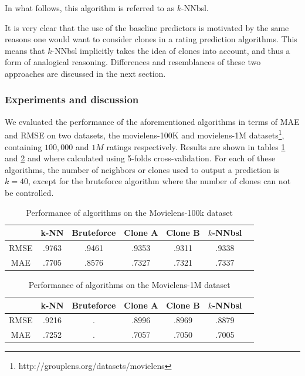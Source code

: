 In what follows, this algorithm is referred to as $k$-NNbsl.


It is very clear that the use of the baseline predictors is motivated by the
same reasons one would want to consider clones in a rating prediction
algorithms. This means that $k$-NNbsl implicitly takes the idea of clones into account, and thus a form of analogical reasoning.
Differences and resemblances of these two approaches are discussed
in the next section.

\subsubsection{Experiments and discussion}
\label{expeDiscuss}

We evaluated the performance of the aforementioned algorithms in terms of MAE
and RMSE on two datasets, the movielens-100K and movielens-1M
datasets\footnote{http://grouplens.org/datasets/movielens}, containing
$100,000$ and $1M$ ratings respectively. Results are shown in tables
\ref{table:res100k} and \ref{table:res1M} and where calculated using 5-folds
cross-validation. For each of these algorithms, the number of neighbors or
clones used to output a prediction is $k = 40$, except for the bruteforce
algorithm where the number of clones can not be controlled.
\begin{table}[!ht]
\centering
\caption{Performance of algorithms on the Movielens-100k dataset}
\label{table:res100k}
\begin{tabular}{| c || c | c | c | c | c | c |}
\toprule
     &  k-NN & Bruteforce & Clone A & Clone B & $k$-NNbsl\\
\midrule
RMSE & .9763 &   .9461    &   .9353 &  .9311  &  .9338   \\
MAE  & .7705 &   .8576    &   .7327 &  .7321  &  .7337   \\
\bottomrule
\end{tabular}
\end{table}

\begin{table}[!ht]
\centering
\caption{Performance of algorithms on the Movielens-1M dataset}
\label{table:res1M}
\begin{tabular}{| c || c | c | c | c | c | c |}
  \toprule
     &  k-NN & Bruteforce & Clone A & Clone B & $k$-NNbsl\\
  \midrule
RMSE & .9216 &           .&   .8996 &  .8969  &  .8879\\
MAE  & .7252 &           .&   .7057 &  .7050  &  .7005\\
\bottomrule
\end{tabular}
\end{table}


